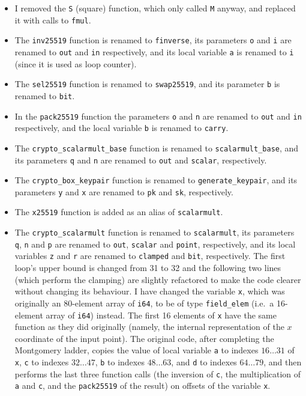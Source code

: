 \documentclass[manuscript]{acmart}
\begin{document}
\begin{itemize}
    \item I removed the \verb|S| (square) function, which only called \verb|M| anyway, and replaced it with calls to \verb|fmul|.
    \item The \verb|inv25519| function is renamed to \verb|finverse|, its parameters \verb|o| and \verb|i| are renamed to \verb|out| and \verb|in| respectively, and its local variable \verb|a| is renamed to \verb|i| (since it is used as loop counter).
    \item The \verb|sel25519| function is renamed to \verb|swap25519|, and its parameter \verb|b| is renamed to \verb|bit|.
    \item In the \verb|pack25519| function the parameters \verb|o| and \verb|n| are renamed to \verb|out| and \verb|in| respectively, and the local variable \verb|b| is renamed to \verb|carry|.
    \item The \verb|crypto_scalarmult_base| function is renamed to \verb|scalarmult_base|, and its parameters \verb|q| and \verb|n| are renamed to \verb|out| and \verb|scalar|, respectively.
    \item The \verb|crypto_box_keypair| function is renamed to \verb|generate_keypair|, and its parameters \verb|y| and \verb|x| are renamed to \verb|pk| and \verb|sk|, respectively.
    \item The \verb|x25519| function is added as an alias of \verb|scalarmult|.
    \item The \verb|crypto_scalarmult| function is renamed to \verb|scalarmult|, its parameters \verb|q|, \verb|n| and \verb|p| are renamed to \verb|out|, \verb|scalar| and \verb|point|, respectively, and its local variables \verb|z| and \verb|r| are renamed to \verb|clamped| and \verb|bit|, respectively.
        The first loop's upper bound is changed from 31 to 32 and the following two lines (which perform the clamping) are slightly refactored to make the code clearer without changing its behaviour.
        I have changed the variable \verb|x|, which was originally an 80-element array of \verb|i64|, to be of type \verb|field_elem| (i.e.\ a 16-element array of \verb|i64|) instead.
        The first 16 elements of \verb|x| have the same function as they did originally (namely, the internal representation of the $x$ coordinate of the input point).
        The original code, after completing the Montgomery ladder, copies the value of local variable \verb|a| to indexes $16 \dots 31$ of \verb|x|, \verb|c| to indexes $32 \dots 47$, \verb|b| to indexes $48 \dots 63$, and \verb|d| to indexes $64 \dots 79$, and then performs the last three function calls (the inversion of \verb|c|, the multiplication of \verb|a| and \verb|c|, and the \verb|pack25519| of the result) on offsets of the variable \verb|x|.

\end{itemize}
\end{document}
